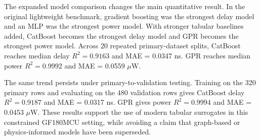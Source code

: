 \documentclass[preprint,12pt]{elsarticle}
\begin{document}
The expanded model comparison changes the main quantitative result. In the original lightweight benchmark, gradient boosting was the strongest delay model and an MLP was the strongest power model. With stronger tabular baselines added, CatBoost becomes the strongest delay model and GPR becomes the strongest power model. Across 20 repeated primary-dataset splits, CatBoost reaches median delay $R^2=0.9163$ and MAE = 0.0347 ns. GPR reaches median power $R^2=0.9992$ and MAE = 0.0559 $\mu$W.

The same trend persists under primary-to-validation testing. Training on the 320 primary rows and evaluating on the 480 validation rows gives CatBoost delay $R^2=0.9187$ and MAE = 0.0317 ns. GPR gives power $R^2=0.9994$ and MAE = 0.0453 $\mu$W. These results support the use of modern tabular surrogates in this constrained GF180MCU setting, while avoiding a claim that graph-based or physics-informed models have been superseded.
\end{document}
